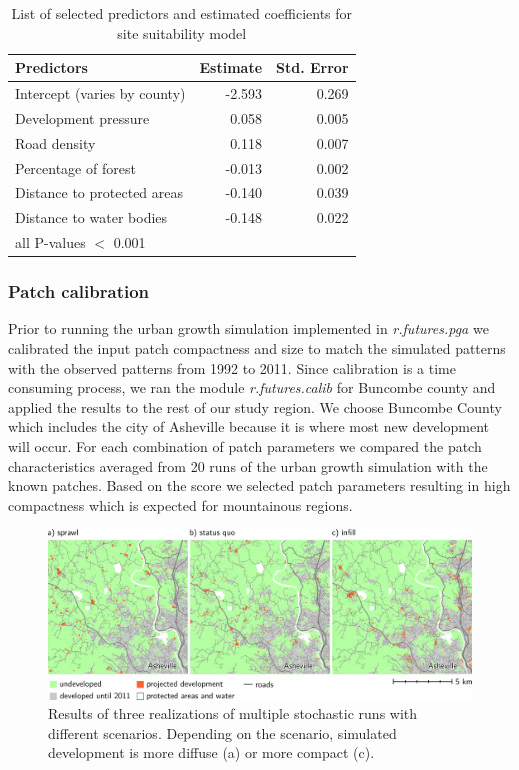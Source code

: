 \documentclass{isprs}
\begin{document}
\begin{table}[htb]
 \centering
\begin{center}
\begin{tabular}{lrr}
\toprule
Predictors & Estimate{\scriptsize *} & Std. Error \\ \midrule
Intercept (varies by county) & -2.593 & 0.269\\
Development pressure & 0.058 & 0.005\\
Road density & 0.118 & 0.007\\
Percentage of forest & -0.013 & 0.002 \\
Distance to protected areas & -0.140 & 0.039\\
Distance to water bodies & -0.148 & 0.022\\
\bottomrule
{\scriptsize * all P-values $<$ 0.001}
\end{tabular}
\end{center}
 \caption{List of selected predictors and estimated coefficients
 for site suitability model}
 \label{tab:predictors}
\end{table}

\subsubsection{Patch calibration}
Prior to running the urban growth simulation implemented in \emph{r.futures.pga}
we calibrated the input patch compactness and size to match
the simulated patterns with the observed patterns from 1992 to 2011.
Since calibration is a time consuming process, we ran the module
\emph{r.futures.calib} for Buncombe county 
and applied the results to the rest of our study region.
We choose Buncombe County which includes the city of Asheville  because it is where most new development will occur.
For each combination of patch parameters we compared the patch characteristics 
averaged from 20 runs of the urban growth simulation with the known patches.
Based on the score we selected patch parameters resulting in high compactness
which is expected for mountainous regions.

\begin{figure}[!h]
 \centering
 \includegraphics[width=2.0\columnwidth]{./figures/results_maps.pdf}
 \caption{Results of three realizations of multiple stochastic runs with different scenarios.
 Depending on the scenario, simulated development is more diffuse (a) or more compact (c).}
 \label{fig:results}
\end{figure}
\end{document}

